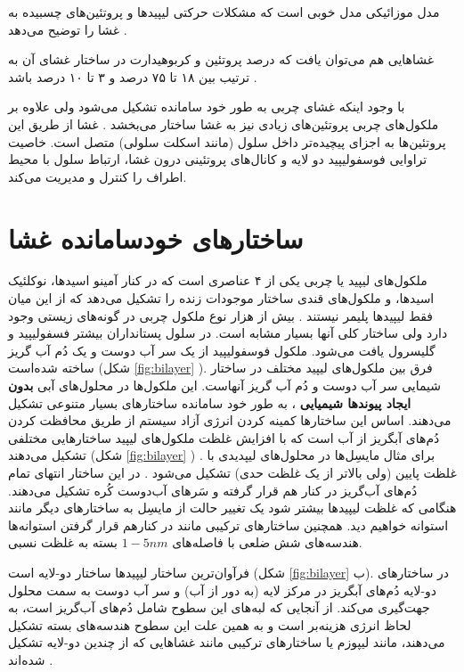 مدل موزائیکی مدل خوبی است که مشکلات حرکتی لیپید‌ها و پروتئین‌های چسبیده به غشا را توضیح می‌دهد
\cite{Simons2000,Simons1997}.


 غشاهایی هم می‌توان یافت که درصد پروتئین و کربوهیدارت در ساختار غشای آن به ترتیب بین ۱۸ تا ۷۵ درصد و  ۳ تا ۱۰ درصد باشد
\cite{MembraneProteins1972}.




با وجود اینکه غشای چربی به طور خود سامانده تشکیل می‌شود ولی علاوه بر ملکول‌های چربی پروتئین‌های زیادی نیز به غشا ساختار می‌بخشد
\cite{wikiCellMembrane}
. غشا از طریق این پروتئین‌ها به اجزای پیچیده‌تر داخل سلول (مانند اسکلت سلولی) متصل است. خاصیت تراوایی فوسفولیپید دو لایه و کانال‌های پروتئینی درون غشا، ارتباط سلول با محیط اطراف را کنترل و مدیریت می‌کند. 






\section{
ساختارهای خودسامانده غشا
}
 
ملکول‌های لیپید یا چربی یکی از ۴ عناصری است که در کنار آمینو اسید‌ها، نوکلئیک اسید‌ها، و ملکول‌های قندی ساختار موجودات زنده را تشکیل می‌دهد که از این میان فقط لیپید‌ها پلیمر نیستند
\cite{Membraneasamatteroffat}
. بیش از هزار نوع ملکول چربی در گونه‌های زیستی وجود دارد ولی ساختار کلی آنها بسیار مشابه است. در سلول‌ پستانداران بیشتر فسفولیپید و گلیسرول یافت می‌شود. ملکول‌ فوسفولیپید از یک سر آب دوست
 و یک دُم آب گریز
 ساخته شده‌است (شکل
\ref{fig:bilayer}
). فرق بین ملکول‌های لیپید مختلف در ساختار شیمایی سر آب دوست و دُم آب‌ گریز آنهاست. این ملکول‌ها در محلول‌های آبی
\textbf{بدون ایجاد پیوندها شیمیایی}
، به طور خود سامانده
 ساختار‌های بسیار متنوعی تشکیل می‌دهند. اساس این ساختار‌ها کمینه کردن انرژی آزاد سیستم از طریق محافظت کردن دُم‌های آبگریز از آب است که با افزایش غلظت ملکول‌های لیپید ساختار‌هایی مختلفی تشکیل می‌دهند
 (شکل
\ref{fig:bilayer}
 )
. برای مثال مایسِل‌ها 
 در محلول‌های لیپدیدی با غلظت‌ پایین (ولی بالاتر از یک غلظت حدی) تشکیل می‌شود
 \cite{Lipowskyb1995ook}
 . در این ساختار انتهای تمام دُم‌های آب‌گریز در کنار هم قرار گرفته و سَر‌های آب‌دوست کُره تشکیل می‌دهند. هنگامی‌ که غلظت لیپید‌ها بیشتر شود یک تغییر حالت از مایسِل به ساختارهای دیگر مانند استوانه خواهیم دید. همچنین ساختار‌های ترکیبی مانند در کنارهم قرار گرفتن استوانه‌ها هندسه‌های شش ضلعی با فاصله‌های 
 $1-5nm$
 بسته به غلظت نسبی. 
 
 فرآوان‌ترین ساختار لیپید‌ها ساختار دو-لایه ‌است (شکل
 \ref{fig:bilayer}
 ب).  در ساختار‌های دو-لایه دُم‌های  آبگریز در مرکز لایه (به دور از آب) و سر آب دوست به سمت محلول جهت‌گیری می‌کند. از آنجایی که لبه‌های این سطوح شامل دُم‌های آب‌گریز است، به لحاظ انرژی هزینه‌بر است و به همین علت این سطوح هندسه‌های بسته تشکیل می‌دهند، مانند لیپوزم
 یا ساختار‌های ترکیبی مانند غشا‌هایی که از چندین دو-لایه تشکیل شده‌اند
\cite{LifeAsaMatterofFat2005}.

